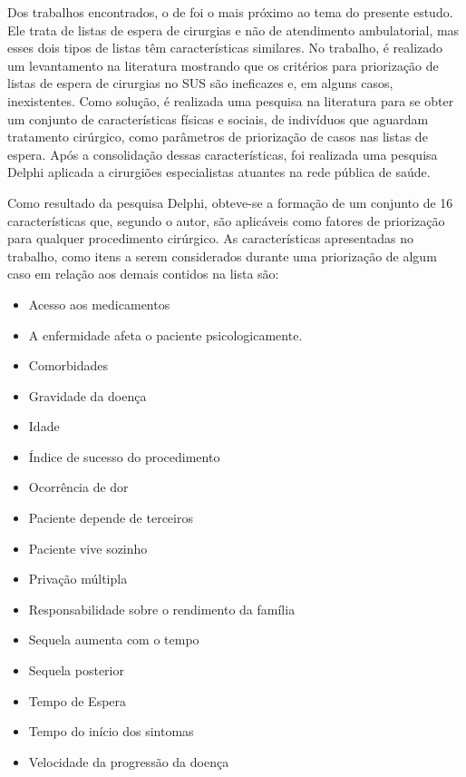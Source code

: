 Dos trabalhos encontrados, o de  foi o mais próximo ao tema do presente estudo. Ele trata de listas de espera de cirurgias e não de atendimento ambulatorial, mas esses dois tipos de listas têm características similares. No trabalho, é realizado um levantamento na literatura mostrando que os critérios para priorização de listas de espera de cirurgias no SUS são ineficazes e, em alguns casos, inexistentes. Como solução, é realizada uma pesquisa na literatura para se obter um conjunto de características físicas e sociais, de indivíduos que aguardam tratamento cirúrgico, como parâmetros de priorização de casos nas listas de espera.
Após a consolidação dessas características, foi realizada uma pesquisa Delphi aplicada a cirurgiões especialistas atuantes na rede pública de saúde.

Como resultado da pesquisa Delphi, obteve-se a formação de um conjunto de 16 características que, segundo o autor, são aplicáveis como fatores de priorização para qualquer procedimento cirúrgico. As características apresentadas no trabalho, como itens a serem considerados durante uma priorização de algum caso em relação aos demais contidos na lista são:

  \begin{itemize}
    	\item Acesso aos medicamentos
        \item A enfermidade afeta o paciente psicologicamente.
        \item Comorbidades
        \item Gravidade da doença
        \item Idade
        \item Índice de sucesso do procedimento
        \item Ocorrência de dor
        \item Paciente depende de terceiros
        \item Paciente vive sozinho
        \item Privação múltipla 
        \item Responsabilidade sobre o rendimento da família
        \item Sequela aumenta com o tempo
        \item Sequela posterior
        \item Tempo de Espera 
        \item Tempo do início dos sintomas
        \item Velocidade da progressão da doença
    \end{itemize}


